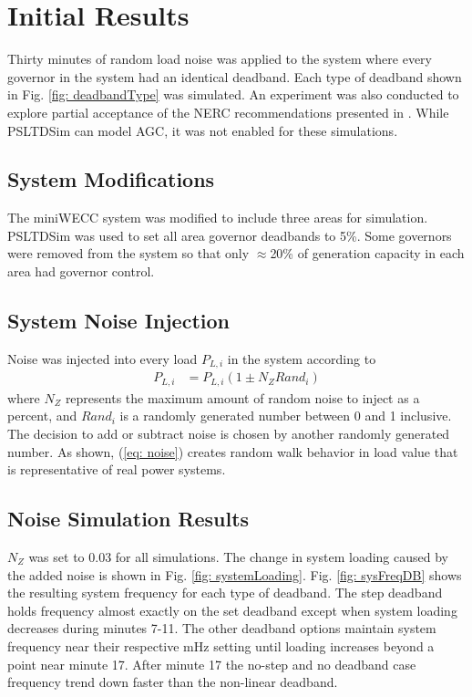 \section{Initial Results}
Thirty minutes of random load noise was applied to the system where every governor in the system had an identical deadband.
Each type of deadband shown in Fig. \ref{fig: deadbandType} was simulated.
An experiment was also conducted to explore partial acceptance of the NERC recommendations presented in \cite{nercFRI2012}.
While PSLTDSim can model AGC, it was not enabled for these simulations.


\subsection{System Modifications}
The miniWECC system was modified to include three areas for simulation.
PSLTDSim was used to set all area governor deadbands to 5\%.
Some governors were removed from the system so that only $\approx$20\% of generation capacity in each area had governor control.

\subsection{System Noise Injection}
Noise was injected into every load $P_{L,i}$ in the system according to
\begin{align}
P_{L,i} &= P_{L,i}(1 \pm N_Z Rand_i) \label{eq: noise}
\end{align}
where $N_Z$ represents the maximum amount of random noise to inject as a percent,
and $Rand_i$ is a randomly generated number between 0 and 1 inclusive.
The decision to add or subtract noise is chosen by another randomly generated number.
As shown, (\ref{eq: noise}) creates random walk behavior in load value that is representative of real power systems\cite{AGCCresap}.


\subsection{Noise Simulation Results}

$N_Z$ was set to 0.03 for all simulations. 
The change in system loading caused by the added noise is shown in Fig. \ref{fig: systemLoading}.
Fig. \ref{fig: sysFreqDB} shows the resulting system frequency for each type of deadband.
The step deadband holds frequency almost exactly on the set deadband except when system loading decreases during minutes 7-11.
The other deadband options maintain system frequency near their respective mHz setting until loading increases beyond a point near minute 17.
After minute 17 the no-step and no deadband case frequency trend down faster than the non-linear deadband.


